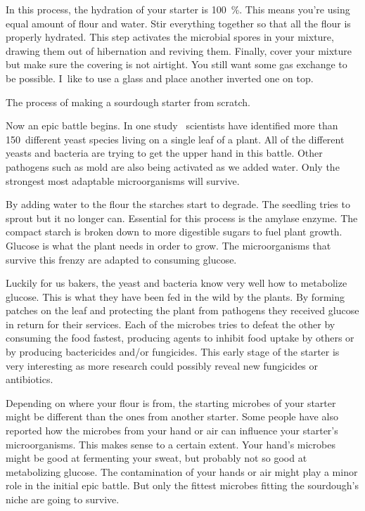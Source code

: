 In this process, the hydration of your starter is \qty{100}{\percent}.
This means you're using equal amount of flour and
water. Stir everything together so that all the flour is
properly hydrated. This step activates the microbial spores
in your mixture, drawing them out of hibernation and
reviving them.
Finally, cover your mixture but make sure the covering is
not airtight. You still want some gas exchange to be possible.
I~like to use a glass and place another
inverted one on top.

\begin{flowchart}[!htb]
\centering
  
  \caption[The full sourdough starter process]{The process of making a sourdough
      starter from scratch.}%
  \label{fig:sourdough-starter-process}
\end{flowchart}

Now an epic battle begins. In one study~\cite{yeasts+biocontrol+agent}
scientists have identified more than \num{150}~different yeast species living
on a single leaf of a plant.
All of the different yeasts and bacteria are trying to get
the upper hand in this battle. Other pathogens such as mold
are also being activated as we added water. Only the strongest
most adaptable microorganisms will survive.

By adding water to the
flour the starches start to degrade. The seedling tries to
sprout but it no longer can. Essential for this process is the
amylase enzyme. The compact starch is broken down to more
digestible sugars to fuel plant growth. Glucose is what the
plant needs in order to grow. The microorganisms that survive
this frenzy are adapted to consuming glucose. 

Luckily for us
bakers, the yeast and bacteria know very well how to metabolize
glucose. This is what they have been fed in the wild by the plants.
By forming patches on the leaf and protecting the plant from
pathogens they received glucose in return for their services.
Each of the microbes tries to defeat the other by consuming the
food fastest, producing agents to inhibit food uptake by others or by producing
bactericides and/or fungicides. This early stage of the starter
is very interesting as more research could possibly reveal
new fungicides or antibiotics. 

Depending on where your flour
is from, the starting microbes of your starter might be different
than the ones from another starter. Some people have also reported
how the microbes from your hand or air can influence your starter's
microorganisms. This makes sense to a certain extent. Your
hand's microbes might be good at fermenting your sweat, but
probably not so good at metabolizing glucose. The contamination
of your hands or air might play a minor role in the initial epic
battle. But only the fittest microbes fitting the sourdough's
niche are going to survive. 


